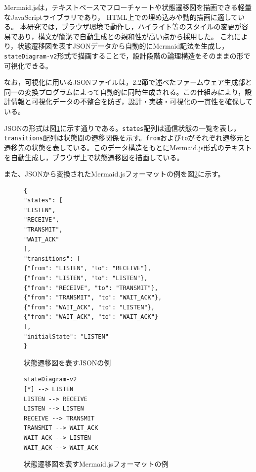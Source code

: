 \documentclass[technicalreport]{ieicej}
\begin{document}
Mermaid.jsは，テキストベースでフローチャートや状態遷移図を描画できる軽量なJavaScriptライブラリであり，
HTML上での埋め込みや動的描画に適している\cite{Mermaid}。
本研究では，ブラウザ環境で動作し，ハイライト等のスタイルの変更が容易であり，構文が簡潔で自動生成との親和性が高い点から採用した。
これにより，状態遷移図を表すJSONデータから自動的にMermaid記法を生成し，\verb|stateDiagram-v2|形式\cite{MermaidStateDiagram}で描画することで，設計段階の論理構造をそのままの形で可視化できる。


なお，可視化に用いるJSONファイルは，2.2節で述べたファームウェア生成部と同一の変換プログラムによって自動的に同時生成される。この仕組みにより，設計情報と可視化データの不整合を防ぎ，設計・実装・可視化の一貫性を確保している。

JSONの形式は図\ref{fig:json-structure}に示す通りである。\texttt{states}配列は通信状態の一覧を表し，\texttt{transitions}配列は状態間の遷移関係を示す。\texttt{from}および\texttt{to}がそれぞれ遷移元と遷移先の状態を表している。このデータ構造をもとにMermaid.js形式のテキストを自動生成し，ブラウザ上で状態遷移図を描画している。

また、JSONから変換されたMermaid.jsフォーマットの例を図\ref{fig:mermaid-example}に示す。
\begin{figure}[h]
\scriptsize
\centering
\begin{lstlisting}
{
"states": [
"LISTEN",
"RECEIVE",
"TRANSMIT",
"WAIT_ACK"
],
"transitions": [
{"from": "LISTEN", "to": "RECEIVE"},
{"from": "LISTEN", "to": "LISTEN"},
{"from": "RECEIVE", "to": "TRANSMIT"},
{"from": "TRANSMIT", "to": "WAIT_ACK"},
{"from": "WAIT_ACK", "to": "LISTEN"},
{"from": "WAIT_ACK", "to": "WAIT_ACK"}
],
"initialState": "LISTEN"
}
\end{lstlisting}
\caption{状態遷移図を表すJSONの例}
\label{fig:json-structure}
\end{figure}



\begin{figure}[h]
\scriptsize
\begin{lstlisting}
stateDiagram-v2
[*] --> LISTEN
LISTEN --> RECEIVE
LISTEN --> LISTEN
RECEIVE --> TRANSMIT
TRANSMIT --> WAIT_ACK
WAIT_ACK --> LISTEN
WAIT_ACK --> WAIT_ACK
\end{lstlisting}
\caption{状態遷移図を表すMermaid.jsフォーマットの例}
\label{fig:mermaid-example}
\end{figure}
\end{document}
